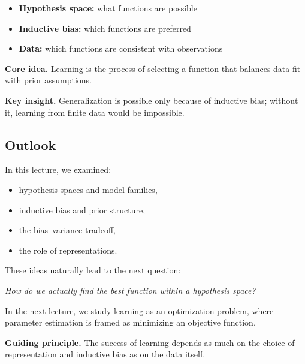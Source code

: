 \begin{itemize}
    \item \textbf{Hypothesis space:} what functions are possible
    \item \textbf{Inductive bias:} which functions are preferred
    \item \textbf{Data:} which functions are consistent with observations
\end{itemize}

\medskip

\noindent
\textbf{Core idea.}  
Learning is the process of selecting a function that balances data fit with prior assumptions.

\medskip

\noindent
\textbf{Key insight.}  
Generalization is possible only because of inductive bias; without it, learning from finite data would be impossible.

\subsection{Outlook}

In this lecture, we examined:

\begin{itemize}
    \item hypothesis spaces and model families,
    \item inductive bias and prior structure,
    \item the bias--variance tradeoff,
    \item the role of representations.
\end{itemize}

\medskip

\noindent
These ideas naturally lead to the next question:

\medskip

\noindent
\textit{How do we actually find the best function within a hypothesis space?}

\medskip

\noindent
In the next lecture, we study learning as an optimization problem, where parameter estimation is framed as minimizing an objective function.

\medskip

\noindent
\textbf{Guiding principle.}  
The success of learning depends as much on the choice of representation and inductive bias as on the data itself.